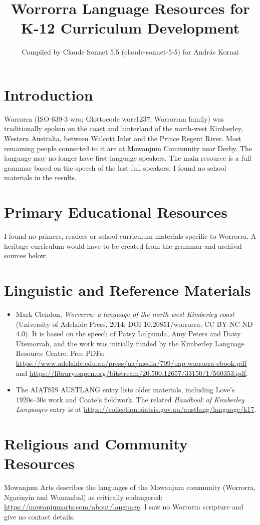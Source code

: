 \documentclass[12pt]{article}
\title{Worrorra Language Resources for K-12 Curriculum Development}
\author{Compiled by Claude Sonnet 5.5 (claude-sonnet-5-5) for Andr\'as Kornai}
\date{}
\begin{document}
\maketitle

\section{Introduction}
Worrorra (ISO 639-3 wro; Glottocode worr1237; Worrorran family) was traditionally spoken on the coast and hinterland of the north-west Kimberley, Western Australia, between Walcott Inlet and the Prince Regent River. Most remaining people connected to it are at Mowanjum Community near Derby. The language may no longer have first-language speakers. The main resource is a full grammar based on the speech of the last full speakers. I found no school materials in the results.

\section{Primary Educational Resources}
I found no primers, readers or school curriculum materials specific to Worrorra. A heritage curriculum would have to be created from the grammar and archival sources below.

\section{Linguistic and Reference Materials}
\begin{itemize}
\item Mark Clendon, \emph{Worrorra: a language of the north-west Kimberley coast} (University of Adelaide Press, 2014; DOI 10.20851/worrorra; CC BY-NC-ND 4.0). It is based on the speech of Patsy Lulpunda, Amy Peters and Daisy Utemorrah, and the work was initially funded by the Kimberley Language Resource Centre. Free PDFs: \url{https://www.adelaide.edu.au/press/ua/media/709/uap-worrorra-ebook.pdf} and \url{https://library.oapen.org/bitstream/20.500.12657/33150/1/560353.pdf}.
\item The AIATSIS AUSTLANG entry lists older materials, including Love's 1920s--30s work and Coate's fieldwork. The related \emph{Handbook of Kimberley Languages} entry is at \url{https://collection.aiatsis.gov.au/austlang/language/k17}.
\end{itemize}

\section{Religious and Community Resources}
Mowanjum Arts describes the languages of the Mowanjum community (Worrorra, Ngarinyin and Wunambal) as critically endangered: \url{https://mowanjumarts.com/about/language}. I saw no Worrorra scripture and give no contact details.
\end{document}
